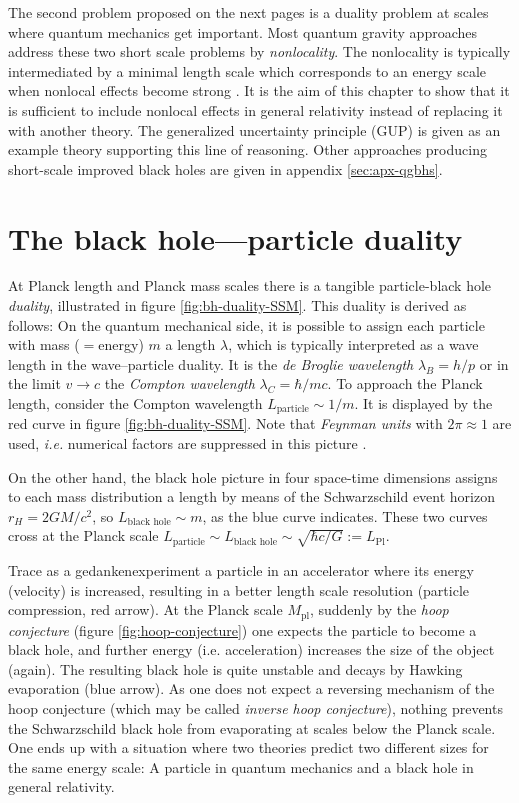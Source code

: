 \documentclass[12pt,a4paper]{report}
\numberwithin{equation}{chapter}
\begin{document}
The second problem proposed on the next pages is a duality problem at scales where quantum mechanics get important. Most quantum gravity approaches address these two short scale problems by \emph{nonlocality}. The nonlocality is typically intermediated by a minimal length scale which corresponds to an energy scale when nonlocal effects become strong \cite{AuriliaSpallucci2013b,Casadio:2014pia,HossenfelderLRR,AdlerSixRoutes}. It is the aim of this chapter to show that it is sufficient to include nonlocal effects in general relativity instead of replacing it with another theory. The generalized uncertainty principle (GUP) is given as an example theory supporting this line of reasoning. Other approaches producing short-scale improved black holes are given in appendix \ref{sec:apx-qgbhs}.


\section{The black hole---particle duality}\label{sec:bh-particle-duality}
At Planck length and Planck mass scales there is a tangible particle-black hole \emph{duality}, illustrated in figure \ref{fig:bh-duality-SSM}. This duality is derived as follows: On the quantum mechanical side, it is possible to assign each particle with mass ($=$energy) $m$ a length $\lambda$, which is typically interpreted as a wave length in the wave--particle duality. It is the \emph{de Broglie wavelength} $\lambda_B = h/p$ or in the limit $v\to c$ the \emph{Compton wavelength} $\lambda_C = \hbar / mc$. To approach the Planck length, consider the Compton wavelength $L_\text{particle} \sim 1/m$. It is displayed by the red curve in figure \ref{fig:bh-duality-SSM}. Note that \emph{Feynman units} with $2\pi \approx 1$ are used, \emph{i.e.} numerical factors are suppressed in this picture \cite{AdlerSixRoutes}.

On the other hand, the black hole picture in four space-time dimensions assigns to each mass distribution a length by means of the Schwarzschild event horizon $r_H = 2GM/c^2$, so $L_\text{black hole} \sim m$, as the blue curve indicates. These two curves cross at the Planck scale $L_\text{particle} \sim L_\text{black hole} \sim \sqrt{\hbar c/G} := L_\text{Pl}$.

Trace as a gedankenexperiment a particle in an accelerator where its energy (velocity) is increased, resulting in a better length scale resolution (particle compression, red arrow). At the Planck scale $M_\text{pl}$, suddenly by the \emph{hoop conjecture} (figure \ref{fig:hoop-conjecture}) one expects the particle to become a black hole, and further energy (i.e. acceleration) increases the size of the object (again). The resulting black hole is quite unstable and decays by Hawking evaporation (blue arrow). As one does not expect a reversing mechanism of the hoop conjecture (which may be called \emph{inverse hoop conjecture}), nothing prevents the Schwarzschild black hole from evaporating at scales below the Planck scale. One ends up with a situation where two theories predict two different sizes for the same energy scale: A particle in quantum mechanics and a black hole in general relativity.
\end{document}
